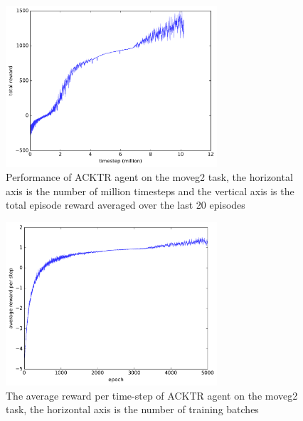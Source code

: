 \begin{figure}[!htbp]
	\includegraphics[width=0.7\textwidth]{images/rec_180528_statlog.pdf}
	\centering
	\caption{Performance of ACKTR agent on the moveg2 task, the horizontal axis is the number of million timesteps and the vertical axis is the total episode reward averaged over the last 20 episodes}\label{rec_stat_moveg2}
\end{figure}

\begin{figure}[!htbp]
	\includegraphics[width=0.7\textwidth]{images/rec_180528_meanrt_statlog.pdf}
	\centering
	\caption{The average reward per time-step of ACKTR agent on the moveg2 task, the horizontal axis is the number of training batches}\label{rec_stat_moveg2_meanrt}
\end{figure}

